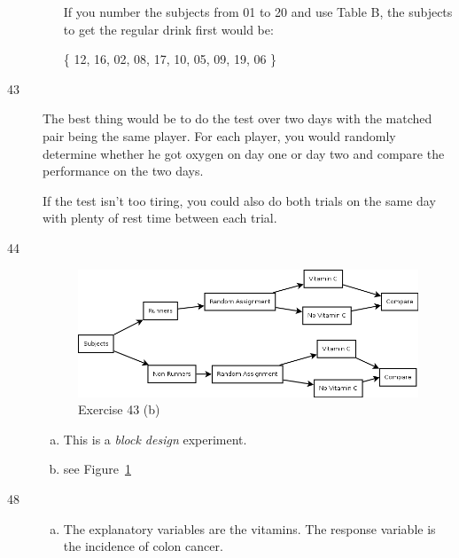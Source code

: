 \documentclass[letterpaper, landscape]{exam}
\begin{document}
\begin{description}
\begin{enumerate}[(a)]
            If you number the subjects from 01 to 20 and use Table B, the
            subjects to get the regular drink first would be:

            \{ 12, 16, 02, 08, 17, 10, 05, 09, 19, 06 \}

        \end{enumerate}

      \item[43]
        The best thing would be to do the test over two days with the matched
        pair being the same player.  For each player, you would randomly
        determine whether he got oxygen on day one or day two and compare the
        performance on the two days.

        If the test isn't too tiring, you could also do both trials on the same
        day with plenty of rest time between each trial.


      \item[44]
        \begin{figure}[H]
          \centering
          \includegraphics[scale = 0.3]{ex43.png}
          \caption{Exercise 43 (b)}\label{fig:ex43}
        \end{figure}
        \begin{enumerate}[(a)]
          \item This is a {\em block design\/} experiment.

          \item see Figure~\ref{fig:ex43}
        \end{enumerate}

      \item[48] 
        \begin{enumerate}[(a)]
          \item The explanatory variables are the vitamins.  The response
            variable is the incidence of colon cancer.


\end{enumerate}
\end{description}
\end{document}
